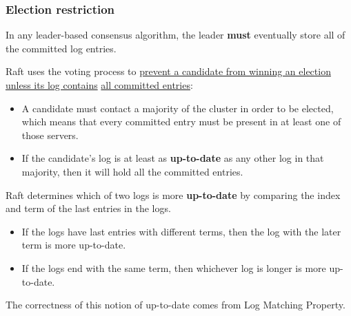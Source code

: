 \documentclass[11pt]{article}
\begin{document}
\subsubsection{Election restriction}
\label{sec:org8c0a827}
In any leader-based consensus algorithm, the leader \textbf{must} eventually store all of the committed log
entries.

Raft uses the voting process to \uline{prevent a candidate from winning an election unless its log contains}
\uline{all committed entries}:
\begin{itemize}
\item A candidate must contact a majority of the cluster in order to be elected, which means that every
committed entry must be present in at least one of those servers.
\item If the candidate's log is at least as \textbf{up-to-date} as any other log in that majority, then it will
hold all the committed entries.
\end{itemize}

Raft determines which of two logs is more \textbf{up-to-date} by comparing the index and term of the last
entries in the logs.
\begin{itemize}
\item If the logs have last entries with different terms, then the log with the later term is more up-to-date.
\item If the logs end with the same term, then whichever log is longer is more up-to-date.
\end{itemize}

The correctness of this notion of up-to-date comes from Log Matching Property.
\end{document}
